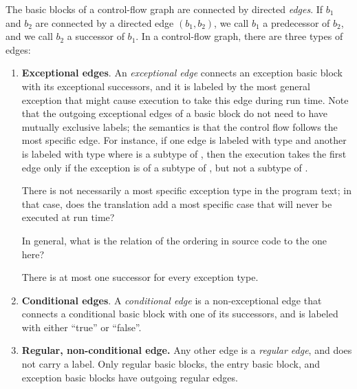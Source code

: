 \begin{definition}
\label{def:edges}
The basic blocks of a control-flow graph are connected by directed
\emph{edges}.  If $b_1$ and $b_2$ are connected by a directed edge
$(b_1,b_2)$, we call $b_1$ a predecessor of $b_2$, and we call $b_2$
a successor of $b_1$.  In a control-flow graph, there are three
types of edges:
\begin{enumerate}
    \item \textbf{Exceptional edges}. An \emph{exceptional edge}
      connects an exception basic block with its exceptional
      successors, and it is labeled by the most general exception that
      might cause execution to take this edge during run time.  Note
      that the outgoing exceptional edges of a basic block do not need
      to have mutually exclusive labels; the semantics is that the
      control flow follows the most specific edge. For instance, if
      one edge is labeled with type  and another is labeled
      with type  where  is a subtype of , then
      the execution takes the first edge only if the exception is of a
      subtype of , but not a subtype of .

\begin{workinprogress}
There is not necessarily a most specific exception type in the program
text; in that case, does the translation add a most specific case that will
never be executed at run time?

In general, what is the relation of the ordering in source code to the
one here?
\end{workinprogress}

    There is at most one successor for every exception type.

    \item \textbf{Conditional edges}. A \emph{conditional edge} is a
      non-exceptional edge that connects a conditional basic block
      with one of its successors, and is labeled with either ``true''
      or ``false''.

    \item \textbf{Regular, non-conditional edge.} Any other edge is a
      \emph{regular edge}, and does not carry a label. Only regular
      basic blocks, the entry basic block, and exception basic blocks
      have outgoing regular edges.
\end{enumerate}
\end{definition}


